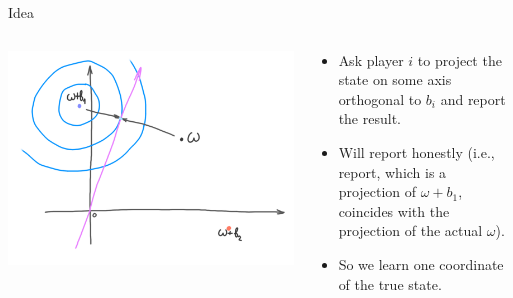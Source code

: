 \documentclass[english,10pt
,aspectratio=169
]{beamer}
\begin{document}
\begin{frame}{Idea}
\begin{columns}
	\begin{column}{0.5\textwidth}
		\begin{center}
			\includegraphics[scale=0.65]{pics/M4/battaglini02.png}
		\end{center}
	\end{column}
	\begin{column}{0.5\textwidth}
		{\small
			\begin{itemize}
				\item Ask player $i$ to project the state on some axis orthogonal to $b_i$ and report the result.
				\item Will report honestly (i.e., report, which is a projection of $\omega +b_1$, coincides with the projection of the actual $\omega$).
				\item So we learn one coordinate of the true state.
			\end{itemize}
		}
	\end{column}
\end{columns}
\end{frame}
\end{document}
